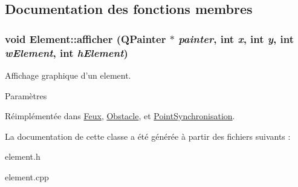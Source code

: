 \subsection{Documentation des fonctions membres}
\hypertarget{classElement_aabcc968ccfa004f84bddda789441368b}{
\subsubsection[{afficher}]{\setlength{\rightskip}{0pt plus 5cm}void Element::afficher (QPainter $\ast$ {\em painter}, \/  int {\em x}, \/  int {\em y}, \/  int {\em wElement}, \/  int {\em hElement})}}
\label{classElement_aabcc968ccfa004f84bddda789441368b}


Affichage graphique d'un element. 


\begin{DoxyParams}{Paramètres}
\item[{\em }]\end{DoxyParams}


Réimplémentée dans \hyperlink{classFeux_a8bb7f9817c38d79927c9a4b471534889}{Feux}, \hyperlink{classObstacle_a77cfc135a2b1fdfe4fab6c7c3713a749}{Obstacle}, et \hyperlink{classPointSynchronisation_a53db6636fdb405bb30fab20b7dc4d374}{PointSynchronisation}.



La documentation de cette classe a été générée à partir des fichiers suivants :\begin{DoxyCompactItemize}
\item 
element.h\item 
element.cpp\end{DoxyCompactItemize}
